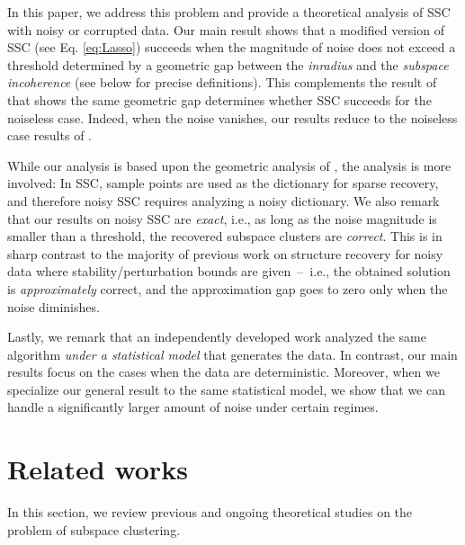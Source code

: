 \documentclass[main]{subfiles}
\begin{document}
In this paper, we address this problem and provide a theoretical analysis of SSC with noisy or corrupted data. Our main result shows that a modified version of SSC (see Eq. \eqref{eq:Lasso}) succeeds when the magnitude of noise does not exceed a threshold determined by a geometric gap between the \emph{inradius} and the \emph{subspace incoherence} (see below for precise definitions). This complements the result of \cite{soltanolkotabi2011geometric} that shows the same geometric gap determines whether SSC succeeds for the noiseless case. Indeed,  when the noise vanishes, our results reduce to the noiseless case results of \cite{soltanolkotabi2011geometric}.

While our analysis is based upon the geometric analysis of \cite{soltanolkotabi2011geometric}, the analysis is more involved: In SSC, sample points are used as the dictionary for sparse recovery, and therefore noisy SSC requires analyzing a noisy dictionary.
We also remark that our results on noisy SSC are {\em exact}, i.e., as long as the noise magnitude is smaller than a threshold, the recovered subspace clusters are {\em correct}.
This is in sharp contrast to the majority of previous work on structure recovery for noisy data where stability/perturbation bounds are given~--~i.e., the obtained solution is {\em approximately} correct, and the approximation gap goes to zero only when the noise diminishes.

Lastly, we remark that an independently developed work \cite{soltanolkotabi2013robust} analyzed the same algorithm {\em under a statistical model} that generates the data. In contrast, our main results focus on the cases when the data are deterministic. Moreover, when we specialize our general result to the same statistical model, we show that we can handle a significantly larger amount of noise under certain regimes.



\section{Related works}\label{sec:RelatedWorks}
In this section, we review  previous and ongoing theoretical studies on the problem of subspace clustering.
\end{document}
